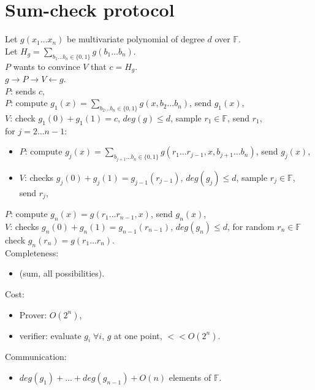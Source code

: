 \documentclass[a4paper, 12pt]{book}
\theoremstyle{definition}
\theoremstyle{remark}
\newcommand{\F}{\mathbb{F}}
\begin{document}
\section{Sum-check protocol}

Let $g(x_1 \dots x_n)$ be multivariate polynomial of degree $d$ over $\F$. \\
Let $H_g = \sum_{b_1 \dots b_n \in \{0, 1\}} g(b_1 \dots b_n)$. \\
$P$ wants to convince $V$ that $c = H_g $. \\
$g \to P \to V \leftarrow g$. \\
$P$: sends $c$, \\
$P$: compute $g_1(x) = \sum_{b_2 \dots b_n \in \{0, 1\}} g(x, b_2 \dots b_n)$, send $g_1(x)$, \\
$V$: check $g_1(0) + g_1(1) = c$, $deg(g) \leq d$, sample $r_1 \in \F$, send $r_1$, \\
for $j = 2 \dots n-1$:
\begin{itemize}[label={}]
  \item $P$: compute $g_j(x) = \sum_{b_{j+1} \dots b_n \in \{0, 1\}} g(r_1 \dots r_{j-1}, x, b_{j+1} \dots b_n)$, send $g_j(x)$,
  \item $V$: checks $g_j(0) + g_j(1) = g_{j-1}(r_{j-1})$, $deg(g_j) \leq d$, sample $r_j \in \F$, send $r_j$,
\end{itemize}
$P$: compute $g_n(x) = g(r_1 \dots r_{n-1}, x)$, send $g_n(x)$, \\
$V$: checks $g_n(0) + g_n(1) = g_{n-1}(r_{n-1})$, $deg(g_n) \leq d$, 
for random $r_n \in \F$ check $g_n(r_n) = g(r_1 \dots r_n)$. \\
Completeness:
\begin{itemize}[label={}]
  \item \checkmark (sum, all possibilities).
\end{itemize}
Cost:
\begin{itemize}[label={}]
  \item Prover: $O\left(2^n\right)$,
  \item verifier: evaluate $g_i \; \forall i$, $g$ at one point, $<< O\left(2^n\right)$.
\end{itemize}
Communication:
\begin{itemize}[label={}]
  \item $deg(g_1) + \dots + deg(g_{n-1}) + O(n)$ elements of $\F$.
\end{itemize}


\end{document}
